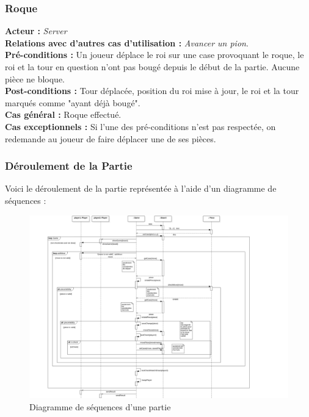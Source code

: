 \documentclass[10pt, a4paper]{article}
\begin{document}
\subsubsection{Roque}
\textbf{Acteur :} \textit{Server} \\
\textbf{Relations avec d'autres cas d'utilisation :} {\itshape Avancer un pion}. \\
\textbf{Pré-conditions :} Un joueur déplace le roi sur une case provoquant le roque, le roi et la tour en question n'ont pas bougé depuis le début de la partie. Aucune pièce ne bloque. \\
\textbf{Post-conditions :} Tour déplacée, position du roi mise à jour, le roi et la tour marqués comme "ayant déjà bougé". \\
\textbf{Cas général :} Roque effectué. \\
\textbf{Cas exceptionnels :} Si l'une des pré-conditions n'est pas respectée, on redemande au joueur de faire déplacer une de ses pièces. \\

\subsubsection{Déroulement de la Partie}
Voici le déroulement de la partie représentée à l'aide d'un diagramme de séquences : \\

\begin{figure}[ht]
\includegraphics[scale=0.53]{SequenceDiagramClassicChessTurn.png}
\caption{Diagramme de séquences d'une partie}
\label{SD_classicgame}
\end{figure}
\clearpage
\end{document}
